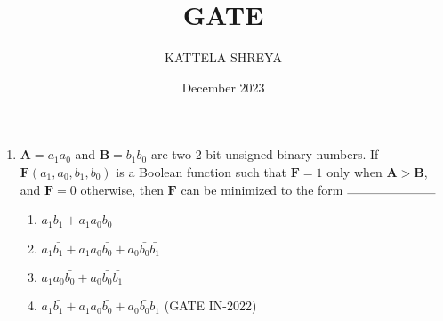 \documentclass[10pt]{article}
\title{GATE}
\author{KATTELA SHREYA}
\date{December 2023}
\let\vec\mathbf
\providecommand{\brak}[1]{\ensuremath{\left(#1\right)}}
\begin{document}
\maketitle
\begin{enumerate}
\item $\vec{A}=a_1a_0$ and $\vec{B}=b_1b_0$ are two 2-bit unsigned binary numbers. If $\vec{F}\brak{a_1,a_0,b_1,b_0}$ is a Boolean function such that $\vec{F} = 1$ only when $\vec{A > B}$, and $\vec{F} = 0$ otherwise, then $\vec{F}$ can be minimized to the form $\rule{2.5cm}{0.10mm}$
\begin{enumerate}
\item $a_1\bar{b_1}+a_1a_0\bar{b_0}$
\item $a_1\bar{b_1}+a_1a_0\bar{b_0}+a_0\bar{b_0}\bar{b_1}$
\item $a_1a_0\bar{b_0}+a_0\bar{b_0}\bar{b_1}$
\item $a_1\bar{b_1}+a_1a_0\bar{b_0}+a_0\bar{b_0}b_1$
\hfill(GATE IN-2022)
\end{enumerate}    
\end{enumerate}
\end{document}
